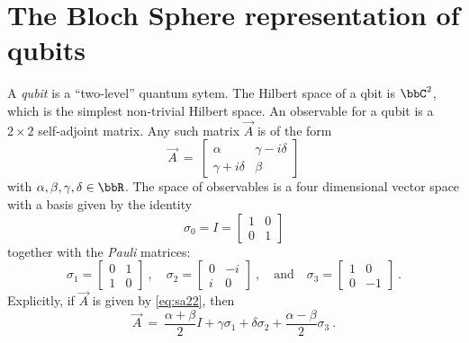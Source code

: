 \documentclass[12pt]{amsart}
\numberwithin{equation}{section}
\numberwithin{figure}{section}
\theoremstyle{theorem}
\begin{document}
	\section{The Bloch Sphere representation of qubits}
	A \emph{qubit} is a ``two-level'' quantum sytem.  The Hilbert space of a 
	qbit is $\bbC^2$, which is the simplest non-trivial Hilbert space. An 
	observable for a qubit is a $2\times 2$ self-adjoint matrix.  Any such 
	matrix $\vec{A}$ is of the form
\begin{equation}\label{eq:sa22}
	\vec{A} \ = \ \begin{bmatrix}
		\alpha & \gamma - i \delta  \\
		\gamma + i \delta & \beta 
 	\end{bmatrix} 
\end{equation}
 with $\alpha,\beta,\gamma,\delta \in \bbR$.  The space of observables 
 is a four dimensional vector space with a basis given by the identity
 $$\sigma_0 = I = \begin{bmatrix} 1 & 0 \\
 	0 & 1 \end{bmatrix} $$
 together with the \emph{Pauli} matrices:
 \begin{equation}\label{eq:Pauli}
 	\sigma_1 = \begin{bmatrix} 0 & 1 \\
 		1 & 0 \end{bmatrix} \ , \quad \sigma_2 = \begin{bmatrix} 0 & -i \\
 		i & 0 \end{bmatrix}\ , \quad \text{and} \quad \sigma_3 = 
 	\begin{bmatrix} 1 
 		& 0 \\ 0 & -1 
 	\end{bmatrix} \ .
 \end{equation}
Explicitly, if $\vec{A}$ is given by \eqref{eq:sa22}, then 
$$\vec{A} \ = \ \frac{\alpha + \beta}{2} I + \gamma \sigma_1 + 
\delta \sigma_2  + \frac{\alpha -\beta}{2} \sigma_3 \ . $$
\end{document}
